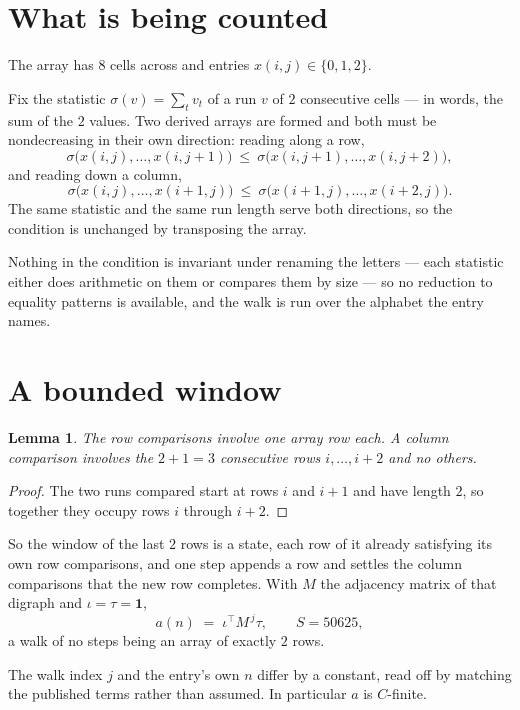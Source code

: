 \documentclass[11pt,a4paper]{article}
\theoremstyle{plain}
\newtheorem{lemma}[theorem]{Lemma}
\theoremstyle{definition}
\begin{document}
\section{What is being counted}

The array has $8$ cells across and entries $x(i,j)\in\{0,1,2\}$.

Fix the statistic $\sigma(v)=\sum_{t} v_t$ of a run $v$ of $2$ consecutive cells --- in words,
the sum of the $2$ values. Two derived arrays are formed and both must be
nondecreasing in their own direction: reading along a row,
\[
\sigma\bigl(x(i,j),\dots,x(i,j{+}1)\bigr)\ \le\
\sigma\bigl(x(i,j{+}1),\dots,x(i,j{+}2)\bigr),
\]
and reading down a column,
\[
\sigma\bigl(x(i,j),\dots,x(i{+}1,j)\bigr)\ \le\
\sigma\bigl(x(i{+}1,j),\dots,x(i{+}2,j)\bigr).
\]
The same statistic and the same run length serve both directions, so the condition is
unchanged by transposing the array.

Nothing in the condition is invariant under renaming the letters --- each statistic either does
arithmetic on them or compares them by size --- so no reduction to equality patterns is
available, and the walk is run over the alphabet the entry names.

\section{A bounded window}

\begin{lemma}\label{lem:win}
The row comparisons involve one array row each. A column comparison involves the
$2+1=3$ consecutive rows $i,\dots,i{+}2$ and no others.
\end{lemma}

\begin{proof}
The two runs compared start at rows $i$ and $i+1$ and have length $2$, so together they
occupy rows $i$ through $i+2$.
\end{proof}

So the window of the last $2$ rows is a state, each row of it already satisfying its own row
comparisons, and one step appends a row and settles the column comparisons that the new row
completes. With $M$ the adjacency matrix of that digraph and $\iota=\tau=\mathbf{1}$,
\[
a(n)\;=\;\iota^{\!\top}M^{\,j}\tau ,\qquad S=50625,
\]
a walk of no steps being an array of exactly $2$ rows.

The walk index $j$ and the entry's own $n$ differ by a constant, read off by matching the
published terms rather than assumed. In particular $a$ is $C$-finite.
\end{document}
